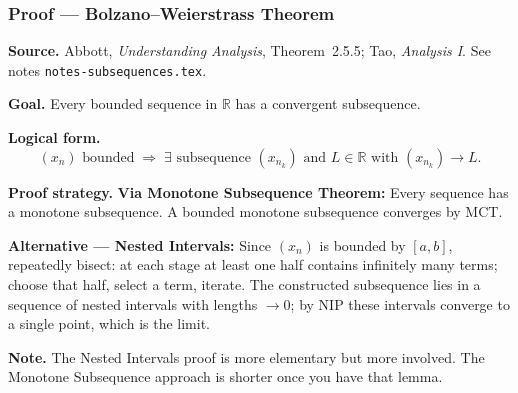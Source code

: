 
\clearpage
{}
\hypertarget{proof-RA-ABB-P-BW}{}

\subsubsection[Bolzano--Weierstrass Theorem]{Proof --- Bolzano--Weierstrass Theorem}

\bigskip

\noindent
\textbf{Source.}
Abbott, \emph{Understanding Analysis}, Theorem~2.5.5; Tao, \emph{Analysis I}.
See notes \texttt{notes-subsequences.tex}.

\vspace{0.75em}

\noindent
\textbf{Goal.}
Every bounded sequence in $\mathbb{R}$ has a convergent subsequence.

\vspace{0.75em}

\noindent
\textbf{Logical form.}
\[
  (x_n) \text{ bounded}
  \;\Rightarrow\;
  \exists \text{ subsequence } (x_{n_k}) \text{ and } L \in \mathbb{R}
  \text{ with } (x_{n_k}) \to L.
\]

\vspace{0.75em}

\noindent
\textbf{Proof strategy.}
\textbf{Via Monotone Subsequence Theorem:} Every sequence has a monotone
subsequence. A bounded monotone subsequence converges by MCT.

\textbf{Alternative — Nested Intervals:} Since $(x_n)$ is bounded by
$[a, b]$, repeatedly bisect: at each stage at least one half contains
infinitely many terms; choose that half, select a term, iterate. The
constructed subsequence lies in a sequence of nested intervals with lengths
$\to 0$; by NIP these intervals converge to a single point, which is the
limit.

\vspace{0.75em}

\noindent
\textbf{Note.}
The Nested Intervals proof is more elementary but more involved.
The Monotone Subsequence approach is shorter once you have that lemma.

\vspace{0.75em}

